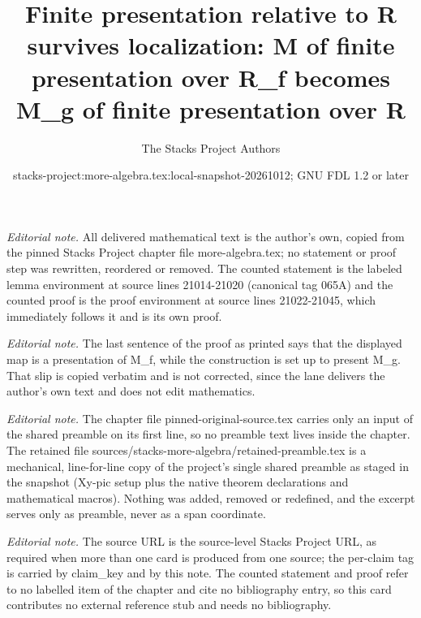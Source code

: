 \documentclass[10pt,a4paper]{amsart}
\title{Finite presentation relative to R survives localization: M of finite presentation over R\_f becomes M\_g of finite presentation over R}
\author{The Stacks Project Authors}
\date{stacks-project:more-algebra.tex:local-snapshot-20261012; GNU FDL 1.2 or later}
\theoremstyle{plain}
\theoremstyle{definition}
\theoremstyle{remark}
\numberwithin{equation}{subsection}
\begin{document}
\maketitle
\setcounter{subsection}{1}
\noindent\textit{Editorial note.} All delivered mathematical text is the author's own, copied from the pinned Stacks Project chapter file more-algebra.tex; no statement or proof step was rewritten, reordered or removed. The counted statement is the labeled lemma environment at source lines 21014-21020 (canonical tag 065A) and the counted proof is the proof environment at source lines 21022-21045, which immediately follows it and is its own proof.\par\medskip
\noindent\textit{Editorial note.} The last sentence of the proof as printed says that the displayed map is a presentation of M\_f, while the construction is set up to present M\_g. That slip is copied verbatim and is not corrected, since the lane delivers the author's own text and does not edit mathematics.\par\medskip
\noindent\textit{Editorial note.} The chapter file pinned-original-source.tex carries only an input of the shared preamble on its first line, so no preamble text lives inside the chapter. The retained file sources/stacks-more-algebra/retained-preamble.tex is a mechanical, line-for-line copy of the project's single shared preamble as staged in the snapshot (Xy-pic setup plus the native theorem declarations and mathematical macros). Nothing was added, removed or redefined, and the excerpt serves only as preamble, never as a span coordinate.\par\medskip
\noindent\textit{Editorial note.} The source URL is the source-level Stacks Project URL, as required when more than one card is produced from one source; the per-claim tag is carried by claim\_key and by this note. The counted statement and proof refer to no labelled item of the chapter and cite no bibliography entry, so this card contributes no external reference stub and needs no bibliography.\par\medskip
\end{document}
